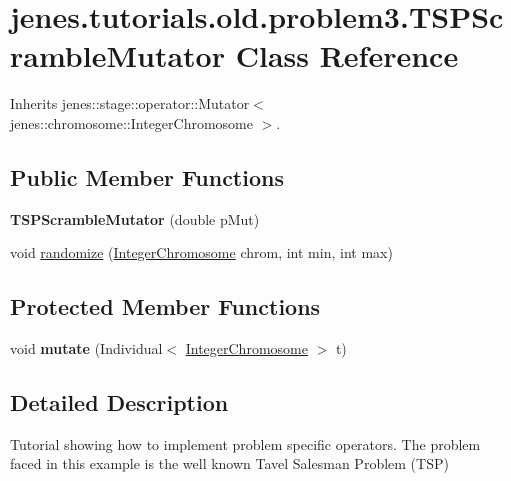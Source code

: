 \hypertarget{classjenes_1_1tutorials_1_1old_1_1problem3_1_1_t_s_p_scramble_mutator}{
\section{jenes.tutorials.old.problem3.TSPScrambleMutator Class Reference}
\label{classjenes_1_1tutorials_1_1old_1_1problem3_1_1_t_s_p_scramble_mutator}
}
Inherits jenes::stage::operator::Mutator$<$ jenes::chromosome::IntegerChromosome $>$.

\subsection*{Public Member Functions}
\begin{CompactItemize}
\item 
\hypertarget{classjenes_1_1tutorials_1_1old_1_1problem3_1_1_t_s_p_scramble_mutator_ca9301f7d3b4b7d7f27e52f462734f49}{
\textbf{TSPScrambleMutator} (double pMut)}
\label{classjenes_1_1tutorials_1_1old_1_1problem3_1_1_t_s_p_scramble_mutator_ca9301f7d3b4b7d7f27e52f462734f49}

\item 
void \hyperlink{classjenes_1_1tutorials_1_1old_1_1problem3_1_1_t_s_p_scramble_mutator_a32403f391bb9ddffb1145b4d852187d}{randomize} (\hyperlink{classjenes_1_1chromosome_1_1_integer_chromosome}{IntegerChromosome} chrom, int min, int max)
\end{CompactItemize}
\subsection*{Protected Member Functions}
\begin{CompactItemize}
\item 
\hypertarget{classjenes_1_1tutorials_1_1old_1_1problem3_1_1_t_s_p_scramble_mutator_7c2d7c9d8b465b19e0c4f8da57e299f3}{
void \textbf{mutate} (Individual$<$ \hyperlink{classjenes_1_1chromosome_1_1_integer_chromosome}{IntegerChromosome} $>$ t)}
\label{classjenes_1_1tutorials_1_1old_1_1problem3_1_1_t_s_p_scramble_mutator_7c2d7c9d8b465b19e0c4f8da57e299f3}

\end{CompactItemize}


\subsection{Detailed Description}
Tutorial showing how to implement problem specific operators. The problem faced in this example is the well known Tavel Salesman Problem (TSP)

